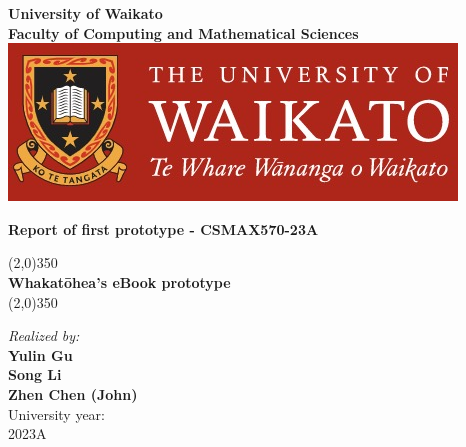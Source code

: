 \begin{titlepage}
  \begin{center}
  \thispagestyle{emptyt}
  \textbf{\Large University of Waikato\\[0.07cm]Faculty of Computing and Mathematical Sciences }\\ [0.3cm]
  
  \includegraphics[scale=0.2]{./Images/UoW.jpg}~\\
  
  \vspace{2cm}
  
  \textbf{\Large Report of first prototype - CSMAX570-23A}\\[0.2cm]
  
  \vspace{0.4cm}
  \hspace{0.3cm}
  
  \begin{center}
  \line(2,0){350}\\
  \vspace*{0.5cm} \textbf{{\LARGE{Whakatōhea's eBook prototype}}}\\
  \vspace*{0.5cm}\line(2,0){350}\\
  \end{center}
  
  \hspace{0.7cm}
    
   \large \emph{Realized by:}\\
  \textbf{\Large{Yulin Gu}} \\[0.5cm]
  \textbf{\Large{Song Li}} \\[0.5cm]
  \textbf{\Large{Zhen Chen (John)}} \\[0.5cm]
  
   
  
  \vfill
  {\large University year:}\\
  {\large 2023A}
  
  
  \end{center}
  \end{titlepage}
  